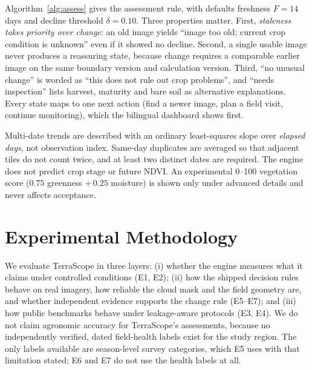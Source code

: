 \documentclass[conference]{IEEEtran}
\begin{document}
Algorithm~\ref{alg:assess} gives the assessment rule, with defaults freshness $F=14$\,days and decline threshold $\delta=0.10$. Three properties matter. First, \emph{staleness takes priority over change}: an old image yields ``image too old; current crop condition is unknown'' even if it showed no decline. Second, a single usable image never produces a reassuring state, because change requires a comparable earlier image on the same boundary version and calculation version. Third, ``no unusual change'' is worded as ``this does not rule out crop problems'', and ``needs inspection'' lists harvest, maturity and bare soil as alternative explanations. Every state maps to one next action (find a newer image, plan a field visit, continue monitoring), which the bilingual dashboard shows first.

Multi-date trends are described with an ordinary least-squares slope over \emph{elapsed days}, not observation index. Same-day duplicates are averaged so that adjacent tiles do not count twice, and at least two distinct dates are required. The engine does not predict crop stage or future NDVI. An experimental 0--100 vegetation score ($0.75$ greenness $+\,0.25$ moisture) is shown only under advanced details and never affects acceptance.

\section{Experimental Methodology}\label{sec:method}
We evaluate TerraScope in three layers: (i) whether the engine measures what it claims under controlled conditions (E1, E2); (ii) how the shipped decision rules behave on real imagery, how reliable the cloud mask and the field geometry are, and whether independent evidence supports the change rule (E5--E7); and (iii) how public benchmarks behave under leakage-aware protocols (E3, E4). We do not claim agronomic accuracy for TerraScope's assessments, because no independently verified, dated field-health labels exist for the study region. The only labels available are season-level survey categories, which E5 uses with that limitation stated; E6 and E7 do not use the health labels at all.
\end{document}
